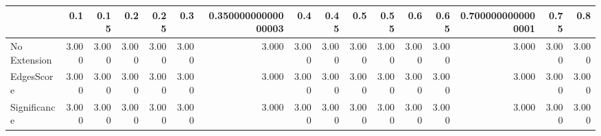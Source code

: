 \begin{tabular}{lrrrrrrrrrrrrrrr}
\toprule
{} &   0.1 &  0.15 &   0.2 &  0.25 &   0.3 & 0.35000000000000003 &   0.4 &  0.45 &   0.5 &  0.55 &   0.6 &  0.65 & 0.7000000000000001 &  0.75 &   0.8 \\
\midrule
No Extension & 3.000 & 3.000 & 3.000 & 3.000 & 3.000 &               3.000 & 3.000 & 3.000 & 3.000 & 3.000 & 3.000 & 3.000 &              3.000 & 3.000 & 3.000 \\
EdgesScore   & 3.000 & 3.000 & 3.000 & 3.000 & 3.000 &               3.000 & 3.000 & 3.000 & 3.000 & 3.000 & 3.000 & 3.000 &              3.000 & 3.000 & 3.000 \\
Significance & 3.000 & 3.000 & 3.000 & 3.000 & 3.000 &               3.000 & 3.000 & 3.000 & 3.000 & 3.000 & 3.000 & 3.000 &              3.000 & 3.000 & 3.000 \\
\bottomrule
\end{tabular}
